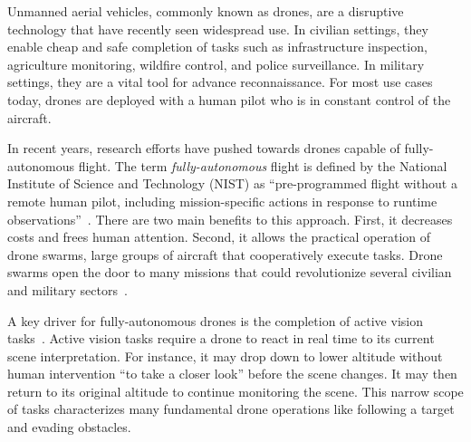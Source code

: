 \label{sec:introduction}
Unmanned aerial vehicles, commonly known as drones, are a disruptive technology that have recently seen widespread use. In civilian settings, they enable cheap and safe completion of tasks such as infrastructure inspection, agriculture monitoring, wildfire control, and police surveillance. In military settings, they are a vital tool for advance reconnaissance. For most use cases today, drones are deployed with a human pilot who is in constant control of the aircraft.

In recent years, research efforts have pushed towards drones capable of fully-autonomous flight. The term \textit{fully-autonomous} flight is defined by the National Institute of Science and Technology (NIST) as “pre-programmed flight without a remote human pilot, including mission-specific actions in response to runtime observations”~\cite{Huang2008}. There are two main benefits to this approach. First, it decreases costs and frees human attention. Second, it allows the practical operation of drone swarms, large groups of aircraft that cooperatively execute tasks. Drone swarms open the door to many missions that could revolutionize several civilian and military sectors~\cite{Burkle2009}. 

A key driver for fully-autonomous drones is the completion of active vision tasks~\cite{Aloimonos1988, Ognibene2013}. Active vision tasks require a drone to react in real time to its current scene interpretation. For instance, it may drop down to lower altitude without human intervention ``to take a closer look'' before the scene changes.  It may then return to its original altitude to continue monitoring the scene. This narrow scope of tasks characterizes many fundamental drone operations like following a target and evading obstacles.

